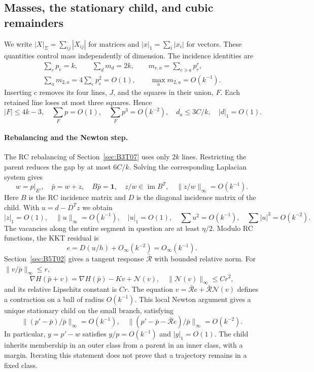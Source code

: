 \subsection{Masses, the stationary child, and cubic remainders}\label{sec:B5T03}
We write $|X|_\Sigma=\sum_{ij}|X_{ij}|$ for matrices and
$|x|_1=\sum_i|x_i|$ for vectors. These quantities control mass independently of dimension.
The incidence identities are
\[
 \begin{gathered}
 \sum_ep_e=k,\qquad\sum_d m_d=2k,\qquad
 m_{r,a}=\sum_{e\ni a}p_e^r,\\
 \sum_a m_{2,a}=4\sum_ep_e^2=O(1),\qquad
 \max_a m_{2,a}=O(k^{-1}).
 \end{gathered}
\]
Inserting $c$ removes its four lines, $J$, and the squares in their union, $F$.
Each retained line loses at most three squares. Hence
\[
 |F|\le4k-3,\quad\sum_Fp=O(1),\quad\sum_Fp^3=O(k^{-2}),
 \quad d_a\le3C/k,\quad |d|_1=O(1).
\]

\paragraph{Rebalancing and the Newton step.}
The RC rebalancing of Section~\ref{sec:B3T07} uses only $2k$ lines. Restricting
the parent reduces the gap by at most $6C/k$. Solving the corresponding Laplacian system gives
\[
 w=p|_{E'},\quad\bar p=w+z,\quad B\bar p=\mathbf1,
 \quad z/w\in\operatorname{im}B^T,\quad\|z/w\|_\infty=O(k^{-1}).
\]
Here $B$ is the RC incidence matrix and $D$ is the diagonal incidence matrix of the child.
With $u=d-D^Tz$ we obtain
\[
 |z|_1=O(1),\quad\|u\|_\infty=O(k^{-1}),\quad|u|_1=O(1),
 \quad\sum u^2=O(k^{-1}),\quad\sum|u|^3=O(k^{-2}).
\]
The vacancies along the entire segment in question are at least $\eta/2$.
Modulo RC functions, the KKT residual is
\[
 e=D(u/h)+O_\infty(k^{-2})=O_\infty(k^{-1}).
\]
Section~\ref{sec:B5T02} gives a tangent response $\bar{\mathcal R}$ with bounded relative norm.
For $\|v/\bar p\|_\infty\le r$,
\[
 \nabla H(\bar p+v)=\nabla H(\bar p)-Kv+\mathcal N(v),\quad
 \|\mathcal N(v)\|_\infty\le Cr^2,
\]
and its relative Lipschitz constant is $Cr$.
The equation $v=\bar{\mathcal R}e+\bar{\mathcal R}\mathcal N(v)$
defines a contraction on a ball of radius $O(k^{-1})$. This local Newton argument gives a unique
stationary child on the small branch, satisfying
\[
 \|(p'-\bar p)/\bar p\|_\infty=O(k^{-1}),\quad
 \|(p'-\bar p-\bar{\mathcal R}e)/\bar p\|_\infty=O(k^{-2}).
\]
In particular, $y=p'-w$ satisfies $y/p=O(k^{-1})$ and $|y|_1=O(1)$.
The child inherits membership in an outer class from a parent in an inner class, with a margin.
Iterating this statement does not prove that a trajectory remains in a fixed class.

